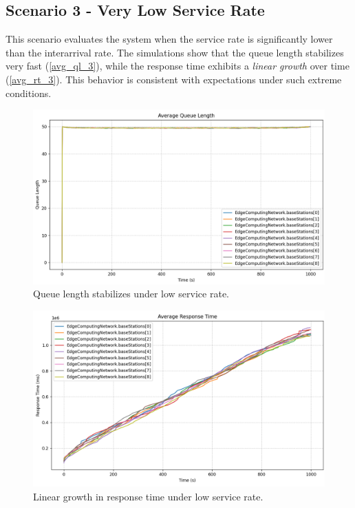 \documentclass{report}
\begin{document}
\subsection{Scenario 3 - Very Low Service Rate}
This scenario evaluates the system when the service rate is significantly lower than the interarrival rate. 
The simulations show that the queue length stabilizes very fast (\autoref{avg_ql_3}), while the response time exhibits a \textit{linear growth} over time (\autoref{avg_rt_3}). This behavior is consistent with expectations under such extreme conditions.

\begin{figure}[H]
    \centering
    \includegraphics[width=1\textwidth]{img/avg_ql_3.png}
    \caption{Queue length stabilizes under low service rate.}
    \label{avg_ql_3}
\end{figure}

\begin{figure}[H]
    \centering
    \includegraphics[width=1\textwidth]{img/avg_rt_3.png}
    \caption{Linear growth in response time under low service rate.}
    \label{avg_rt_3}
\end{figure}
\end{document}

